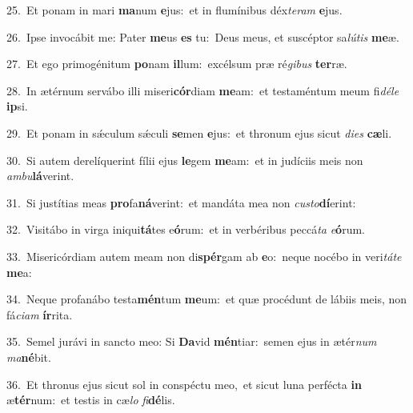 {\numbfont\textcolor{\numbcolor}{25.}}~Et ponam in mari \textbf{ma}\-num \textbf{e}\-jus:~\star et in flumínibus déx\-\textit{te}\-\textit{ram} \textbf{e}\-jus.\par
{\numbfont\textcolor{\numbcolor}{26.}}~Ipse invocábit me: Pater \textbf{me}\-us \textbf{es} tu:~\star Deus meus, et suscéptor sa\-\textit{lú}\-\textit{tis} \textbf{me}\-æ.\par
{\numbfont\textcolor{\numbcolor}{27.}}~Et ego primogénitum \textbf{po}\-nam \textbf{il}\-lum:~\star excélsum præ ré\-\textit{gi}\-\textit{bus} \textbf{ter}\-ræ.\par
{\numbfont\textcolor{\numbcolor}{28.}}~In ætérnum servábo illi miseri\-\textbf{cór}\-diam \textbf{me}\-am:~\star et testaméntum meum fi\-\textit{dé}\-\textit{le} \textbf{ip}\-si.\par
{\numbfont\textcolor{\numbcolor}{29.}}~Et ponam in sǽculum sǽculi \textbf{se}\-men \textbf{e}\-jus:~\star et thronum ejus sicut \textit{di}\-\textit{es} \textbf{cæ}\-li.\par
{\numbfont\textcolor{\numbcolor}{30.}}~Si autem derelíquerint fílii ejus \textbf{le}\-gem \textbf{me}\-am:~\star et in judíciis meis non \textit{am}\-\textit{bu}\textbf{lá}verint.\par
{\numbfont\textcolor{\numbcolor}{31.}}~Si justítias meas \textbf{pro}\-fa\-\textbf{ná}\-verint:~\star et mandáta mea non \textit{cus}\-\textit{to}\textbf{dí}erint:\par
{\numbfont\textcolor{\numbcolor}{32.}}~Visitábo in virga iniqui\-\textbf{tá}\-tes e\-\textbf{ó}\-rum:~\star et in verbéribus peccá\textit{ta} \textit{e}\-\textbf{ó}rum.\par
{\numbfont\textcolor{\numbcolor}{33.}}~Misericórdiam autem meam non di\-\textbf{spér}\-gam ab \textbf{e}\-o:~\star neque nocébo in veri\-\textit{tá}\-\textit{te} \textbf{me}\-a:\par
{\numbfont\textcolor{\numbcolor}{34.}}~Neque profanábo testa\-\textbf{mén}\-tum \textbf{me}\-um:~\star et quæ procédunt de lábiis meis, non fá\-\textit{ci}\-\textit{am} \textbf{ír}\-rita.\par
{\numbfont\textcolor{\numbcolor}{35.}}~Semel jurávi in sancto meo: Si \textbf{Da}\-vid \textbf{mén}\-tiar:~\star semen ejus in ætér\textit{num} \textit{ma}\-\textbf{né}bit.\par
{\numbfont\textcolor{\numbcolor}{36.}}~Et thronus ejus sicut sol in conspéctu meo,~\dagger et sicut luna perfécta \textbf{in} æ\-\textbf{tér}\-num:~\star et testis in cæ\textit{lo} \textit{fi}\-\textbf{dé}lis.\par
